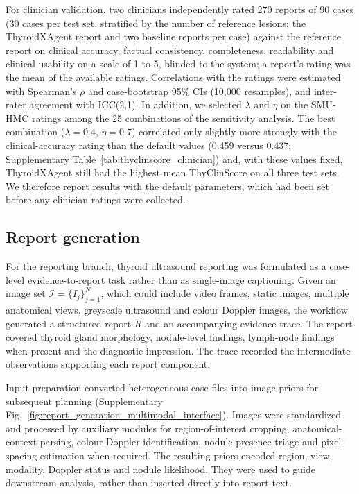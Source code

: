 \documentclass[fleqn,10pt]{wlscirep}
\begin{document}
For clinician validation, two clinicians independently rated 270 reports of 90 cases (30 cases per test set, stratified by the number of reference lesions; the ThyroidXAgent report and two baseline reports per case) against the reference report on clinical accuracy, factual consistency, completeness, readability and clinical usability on a scale of 1 to 5, blinded to the system; a report's rating was the mean of the available ratings. Correlations with the ratings were estimated with Spearman's \(\rho\) and case-bootstrap 95\% CIs (10,000 resamples), and inter-rater agreement with ICC(2,1). In addition, we selected \(\lambda\) and \(\eta\) on the SMU-HMC ratings among the 25 combinations of the sensitivity analysis. The best combination (\(\lambda=0.4\), \(\eta=0.7\)) correlated only slightly more strongly with the clinical-accuracy rating than the default values (0.459 versus 0.437; Supplementary Table~\ref{tab:thyclinscore_clinician}) and, with these values fixed, ThyroidXAgent still had the highest mean ThyClinScore on all three test sets. We therefore report results with the default parameters, which had been set before any clinician ratings were collected.



\subsection{Report generation}
For the reporting branch, thyroid ultrasound reporting was formulated as a case-level evidence-to-report task rather than as single-image captioning. Given an image set \(\mathcal{I}=\{I_j\}_{j=1}^{N}\), which could include video frames, static images, multiple anatomical views, greyscale ultrasound and colour Doppler images, the workflow generated a structured report \(R\) and an accompanying evidence trace. The report covered thyroid gland morphology, nodule-level findings, lymph-node findings when present and the diagnostic impression. The trace recorded the intermediate observations supporting each report component.

Input preparation converted heterogeneous case files into image priors for subsequent planning (Supplementary Fig.~\ref{fig:report_generation_multimodal_interface}). Images were standardized and processed by auxiliary modules for region-of-interest cropping, anatomical-context parsing, colour Doppler identification, nodule-presence triage and pixel-spacing estimation when required. The resulting priors encoded region, view, modality, Doppler status and nodule likelihood. They were used to guide downstream analysis, rather than inserted directly into report text.
\end{document}
